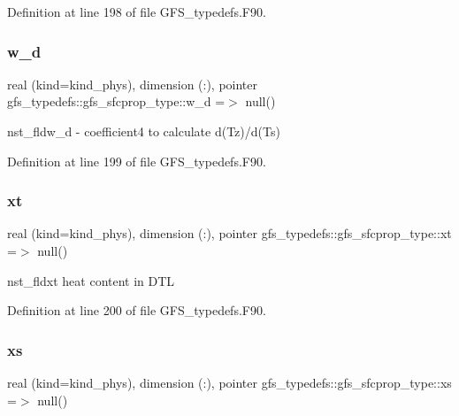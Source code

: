 Definition at line 198 of file G\+F\+S\+\_\+typedefs.\+F90.

\mbox{\label{structgfs__typedefs_1_1gfs__sfcprop__type_ab594fd808f299a5950d3f5a3da0f3b53}} 
\subsubsection{w\+\_\+d}
{\footnotesize\ttfamily real (kind=kind\+\_\+phys), dimension    (\+:), pointer gfs\+\_\+typedefs\+::gfs\+\_\+sfcprop\+\_\+type\+::w\+\_\+d =$>$ null()}



nst\+\_\+fldw\+\_\+d -\/ coefficient4 to calculate d(\+Tz)/d(Ts) 



Definition at line 199 of file G\+F\+S\+\_\+typedefs.\+F90.

\mbox{\label{structgfs__typedefs_1_1gfs__sfcprop__type_ac9f760f9c98c724926be8799ebdb43a3}} 
\subsubsection{xt}
{\footnotesize\ttfamily real (kind=kind\+\_\+phys), dimension     (\+:), pointer gfs\+\_\+typedefs\+::gfs\+\_\+sfcprop\+\_\+type\+::xt =$>$ null()}



nst\+\_\+fldxt heat content in D\+TL 



Definition at line 200 of file G\+F\+S\+\_\+typedefs.\+F90.

\mbox{\label{structgfs__typedefs_1_1gfs__sfcprop__type_a31978399f44c55aa3a4758792f5c955c}} 
\subsubsection{xs}
{\footnotesize\ttfamily real (kind=kind\+\_\+phys), dimension     (\+:), pointer gfs\+\_\+typedefs\+::gfs\+\_\+sfcprop\+\_\+type\+::xs =$>$ null()}



